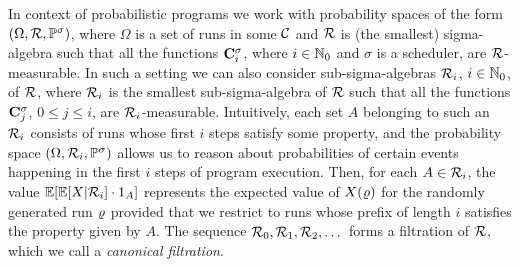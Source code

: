 In context of probabilistic programs we work with probability 
spaces of the form $(\Omega,\mathcal{R},\mathbb{P}^\sigma)$, where $\Omega$ is a 
set of runs in some $\mathcal{C}$ and $\mathcal{R}$ is (the smallest) sigma-algebra 
such that all the functions $\mathbf{C}^{\sigma}_{i}$, where $i\in \mathbb{N}_0$ and 
$\sigma$ is a scheduler, are $\mathcal{R}$-measurable. In such a setting we can 
also consider sub-sigma-algebras $\mathcal{R}_i$, $i\in \mathbb{N}_0$, of 
$\mathcal{R}$, where $\mathcal{R}_i$ is the smallest sub-sigma-algebra of 
$\mathcal{R}$ such that all the functions $\mathbf{C}^{\sigma}_{j}$, $0\leq j \leq 
i$, are $\mathcal{R}_i$-measurable. Intuitively, each set $A$ belonging to such 
an $\mathcal{R}_i$ consists of runs whose first $i$ steps satisfy some 
property, and the probability space $(\Omega,\mathcal{R}_i,\mathbb{P}^\sigma)$ 
allows us to reason about probabilities of certain events happening in the 
first 
$i$ steps of program execution. 
Then, for each $A\in \mathcal{R}_i$, the 
value $\mathbb{E}[\mathbb{E}[X|\mathcal{R}_i]\cdot 1_A]$ represents the expected value of 
$X(\varrho)$ for the randomly generated run $\varrho$ provided that we restrict to 
runs whose
prefix of length $i$ satisfies the property given by $A$. 
The sequence $\mathcal{R}_0,\mathcal{R}_1,\mathcal{R}_2,\dots$ forms a 
filtration of $\mathcal{R}$, which we call a \emph{canonical filtration}.



